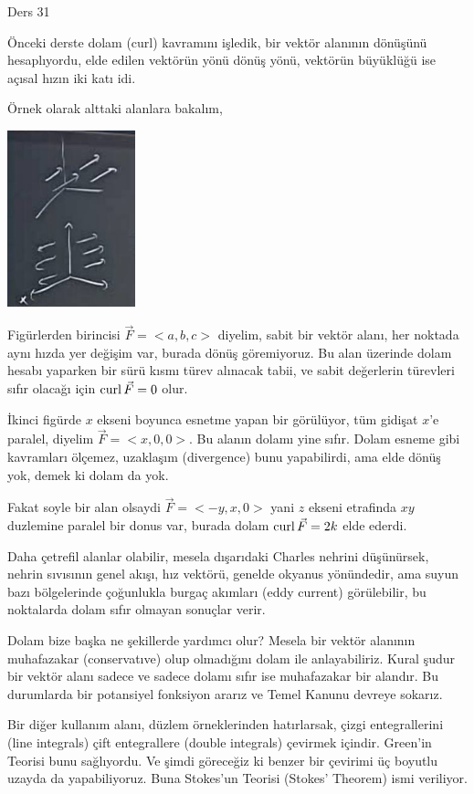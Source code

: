 \documentclass[12pt,fleqn]{article}\usepackage{../../common}
\begin{document}
Ders 31

Önceki derste dolam (curl) kavramını işledik, bir vektör alanının dönüşünü
hesaplıyordu, elde edilen vektörün yönü dönüş yönü, vektörün büyüklüğü ise
açısal hızın iki katı idi.

Örnek olarak alttaki alanlara bakalım,

\includegraphics[width=10em]{calc_multi_31_01.jpg}

Figürlerden birincisi $\vec{F} = < a,b,c >$ diyelim, sabit bir vektör
alanı, her noktada aynı hızda yer değişim var, burada dönüş göremiyoruz.
Bu alan üzerinde dolam hesabı yaparken bir sürü kısmı türev alınacak tabii,
ve sabit değerlerin türevleri sıfır olacağı için $\operatorname{curl} \vec{F} = 0$ olur.

İkinci figürde $x$ ekseni boyunca esnetme yapan bir görülüyor, tüm gidişat $x$'e
paralel, diyelim $\vec{F} = < x, 0, 0 >$. Bu alanın dolamı yine sıfır.  Dolam
esneme gibi kavramları ölçemez, uzaklaşım (divergence) bunu yapabilirdi, ama
elde dönüş yok, demek ki dolam da yok.

Fakat soyle bir alan olsaydi $\vec{F} = < -y, x, 0 >$ yani $z$ ekseni etrafinda
$xy$ duzlemine paralel bir donus var, burada dolam $\operatorname{curl} \vec{F} = 2 k$ elde
ederdi.

Daha çetrefil alanlar olabilir, mesela dışarıdaki Charles nehrini düşünürsek,
nehrin sıvısının genel akışı, hız vektörü, genelde okyanus yönündedir, ama
suyun bazı bölgelerinde çoğunlukla burgaç akımları (eddy current) görülebilir,
bu noktalarda dolam sıfır olmayan sonuçlar verir.

Dolam bize başka ne şekillerde yardımcı olur? Mesela bir vektör alanının
muhafazakar (conservatıve) olup olmadığını dolam ile anlayabiliriz. Kural şudur
bir vektör alanı sadece ve sadece dolamı sıfır ise muhafazakar bir alandır.
Bu durumlarda bir potansiyel fonksiyon ararız ve Temel Kanunu devreye sokarız.

Bir diğer kullanım alanı, düzlem örneklerinden hatırlarsak, çizgi entegrallerini
(line integrals) çift entegrallere (double integrals) çevirmek içindir. Green'in
Teorisi bunu sağlıyordu. Ve şimdi göreceğiz ki benzer bir çevirimi üç boyutlu
uzayda da yapabiliyoruz. Buna Stokes'un Teorisi (Stokes' Theorem) ismi veriliyor.
\end{document}
